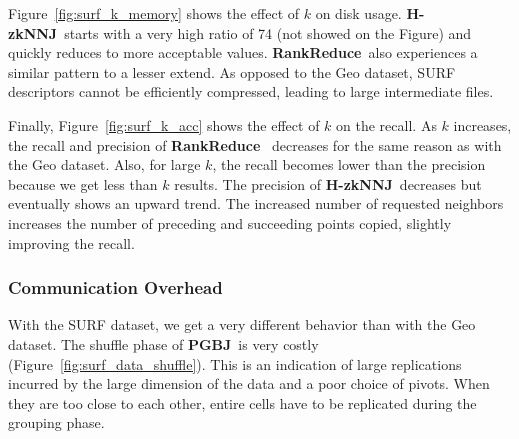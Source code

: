 \documentclass[10pt,journal,compsoc]{IEEEtran}
\newcommand{\TODO}[1]{\textcolor{red}{\textbf{[TODO:#1]}}}
\newcommand{\Z}{{\bf H-zkNNJ}}
\newcommand{\LSH}{{\bf RankReduce}}
\newcommand{\VO}{{\bf PGBJ}}
\begin{document}
Figure~\ref{fig:surf_k_memory} shows the effect of $k$ on disk usage. \Z~starts with a very high ratio of 74 
(not showed on the Figure) and 
quickly reduces to more acceptable values. 
 \LSH~also experiences a similar pattern to a lesser extend. As opposed to the Geo dataset, SURF 
descriptors cannot be efficiently compressed, leading to large intermediate files.

Finally, Figure~\ref{fig:surf_k_acc} shows the effect of $k$ on the recall. As $k$ increases, the recall and precision 
of \LSH~ decreases for the same reason as with the Geo dataset. Also, for large $k$, the recall becomes lower
than the precision because we get less than $k$ results. The precision of \Z~decreases but eventually shows an upward 
trend. The increased number of requested neighbors increases the number of preceding and
succeeding points copied, slightly improving the recall.

\subsubsection{Communication Overhead}
With the SURF dataset, we get a very different behavior than with the Geo dataset. The shuffle phase of \VO~is very 
costly (Figure~\ref{fig:surf_data_shuffle}). This is an indication of large replications incurred by the large 
dimension of the data and a poor choice of pivots. When they are too close to each other, entire cells have to be 
replicated during the grouping phase.
\end{document}
